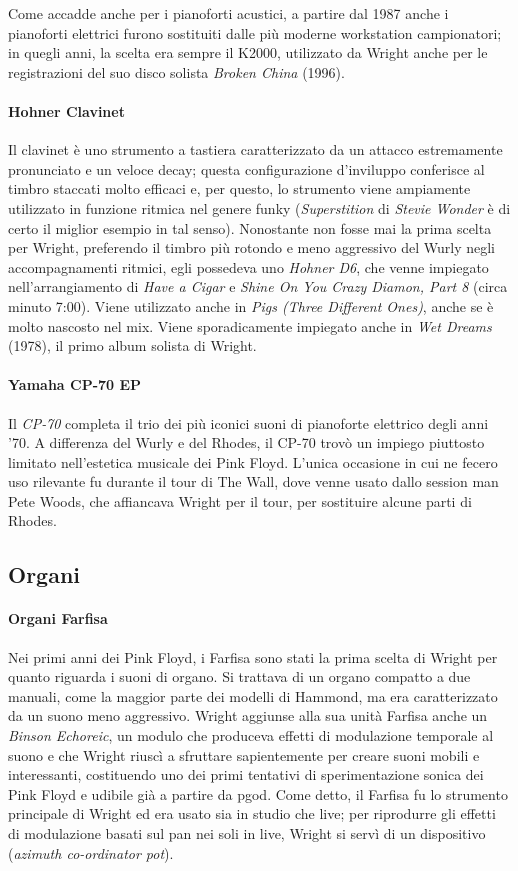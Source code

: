 \documentclass[class=book, crop=false, oneside, 12pt]{standalone}
\begin{document}
    Come accadde anche per i pianoforti acustici, a partire dal 1987 anche i pianoforti elettrici furono sostituiti dalle più moderne workstation campionatori; in quegli anni, la scelta era sempre il K2000, utilizzato da Wright anche per le registrazioni del suo disco solista \emph{Broken China} (1996).

    \paragraph{Hohner Clavinet}
    Il clavinet è uno strumento a tastiera caratterizzato da un attacco estremamente pronunciato e un veloce decay; questa configurazione d'inviluppo conferisce al timbro staccati molto efficaci e, per questo, lo strumento viene ampiamente utilizzato in funzione ritmica nel genere funky (\emph{Superstition} di \emph{Stevie Wonder} è di certo il miglior esempio in tal senso). Nonostante non fosse mai la prima scelta per Wright, preferendo il timbro più rotondo e meno aggressivo del Wurly negli accompagnamenti ritmici, egli possedeva uno \emph{Hohner D6}, che venne impiegato nell'arrangiamento di \emph{Have a Cigar} e \emph{Shine On You Crazy Diamon, Part 8} (circa minuto 7:00). Viene utilizzato anche in \emph{Pigs (Three Different Ones)}, anche se è molto nascosto nel mix. Viene sporadicamente impiegato anche in \emph{Wet Dreams} (1978), il primo album solista di Wright.

    \paragraph{Yamaha CP-70 EP}
    Il \emph{CP-70} completa il trio dei più iconici suoni di pianoforte elettrico degli anni '70. A differenza del Wurly e del Rhodes, il CP-70 trovò un impiego piuttosto limitato nell'estetica musicale dei Pink Floyd. L'unica occasione in cui ne fecero uso rilevante fu durante il tour di The Wall, dove venne usato dallo session man Pete Woods, che affiancava Wright per il tour, per sostituire alcune parti di Rhodes.

    \subsection{Organi}
    \paragraph{Organi Farfisa}
    Nei primi anni dei Pink Floyd, i Farfisa sono stati la prima scelta di Wright per quanto riguarda i suoni di organo. Si trattava di un organo compatto a due manuali, come la maggior parte dei modelli di Hammond, ma era caratterizzato da un suono meno aggressivo. Wright aggiunse alla sua unità Farfisa anche un \emph{Binson Echoreic}, un modulo che produceva effetti di modulazione temporale al suono e che Wright riuscì a sfruttare sapientemente per creare suoni mobili e interessanti, costituendo uno dei primi tentativi di sperimentazione sonica dei Pink Floyd e udibile già a partire da \acrshort{pgod}. Come detto, il Farfisa fu lo strumento principale di Wright ed era usato sia in studio che live; per riprodurre gli effetti di modulazione basati sul pan nei soli in live, Wright si servì di un dispositivo (\emph{azimuth co-ordinator pot}).
\end{document}
